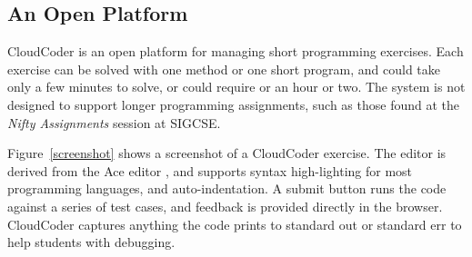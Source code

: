 \documentclass{sig-alternate}
\begin{document}

% 
%



\subsection{An Open Platform}

CloudCoder is an open platform for managing short programming
exercises.  Each exercise can be solved with one method or one short
program, and could take only a few minutes to solve, or could require
or an hour or two.  The system is not designed to support longer
programming assignments, such as those found at the {\em Nifty
  Assignments} session at SIGCSE.

Figure~\ref{screenshot} shows a screenshot of a CloudCoder exercise.
The editor is derived from the Ace editor \cite{ace}, and supports
syntax high-lighting for most programming languages, and
auto-indentation.  
A submit button runs the code against a series of
test cases, and feedback is provided directly in the browser.
CloudCoder captures anything the code prints to standard out or
standard err to help students with debugging.
\end{document}
